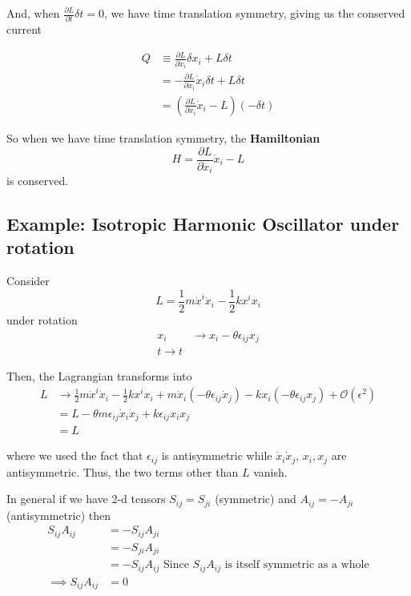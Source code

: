 \documentclass[11pt]{article}
\begin{document}
\vskip 0.5cm
And, when $ \frac{\partial L}{\partial t} \delta t  = 0$, we have time translation symmetry, giving us the conserved current

\begin{align*}
  Q &\equiv  \frac{\partial L}{\partial \dot{x}_i} \delta x_i + L \delta t \\
  &= -  \frac{\partial L}{\partial \dot{x}_i} \dot{x}_i \delta t  +  L \delta t \\
  &= \left(  \frac{\partial L}{\partial \dot{x}_i} \dot{x}_i - L \right) \left(- \delta t\right)
\end{align*}

\vskip 0.5cm
\begin{bluebox}
So when we have time translation symmetry, the \textbf{Hamiltonian}
\[ H =  \frac{\partial L}{\partial \dot{x}_i} \dot{x}_i - L  \]
is conserved.
\end{bluebox}

\vskip 0.5cm
\subsection{Example: Isotropic Harmonic Oscillator under rotation}
Consider 
\[ L = \frac{1}{2}m \dot{x}^i \dot{x}_i - \frac{1}{2}k x^i x_i \]
under rotation
\begin{align*}
  x_i &\rightarrow x_i - \theta \epsilon_{ij} x_j \\
  t \rightarrow t
\end{align*}

Then, the Lagrangian transforms into 
\begin{align*}
  L &\rightarrow \frac{1}{2}m \dot{x}^i \dot{x}_i - \frac{1}{2}k x^i x_i + m\dot{x}_i \left(-\theta \epsilon_{ij} \dot{x}_j\right) - kx_i \left(-\theta \epsilon_{ij} x_j\right) + \mathcal{O}(\epsilon^2) \\
  &= L - \theta m \epsilon_{ij} \dot{x}_i \dot{x}_j + k \epsilon_{ij} x_{i} x_{j} \\
  &= L
\end{align*}

where we used the fact that $\epsilon_{ij}$ is antisymmetric while $\dot{x}_i \dot{x}_j$, $x_i, x_j$ are antisymmetric. Thus, 
the two terms other than $L$ vanish.

\begin{redbox}
  In general if we have 2-d tensors $S_{ij} = S_{ji}$ (symmetric) and $A_{ij} = -A_{ji}$ (antisymmetric) then 
  \begin{align*}
    S_{ij} A_{ij} &= -S_{ij} A_{ji} \\
    &= -S_{ji} A_{ji} \\
    &= -S_{ij} A_{ij} \text{ Since $S_{ij} A_{ij}$ is itself symmetric as a whole} \\
    \implies S_{ij} A_{ij} &= 0
  \end{align*}
\end{redbox}
\end{document}
